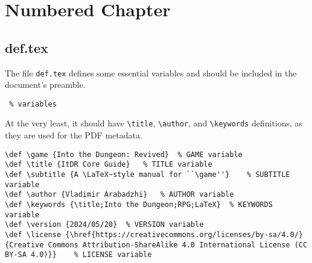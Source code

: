 \documentclass[itdr]{subfiles}
\begin{document}
\chapter{Numbered Chapter}
\label{ch:numbered}

\section{def.tex}

The file \lstinline!def.tex! defines some essential variables and should be included in the document's preamble.

\begin{lstlisting}
 % variables
\end{lstlisting}

At the very least, it should have \lstinline!\title!, \lstinline!\author!, and \lstinline!\keywords! definitions, as they are used for the PDF metadata.

\vspace{\baselineskip}
\noindent\begin{minipage}{\textwidth}
\begin{lstlisting}
\def \game {Into the Dungeon: Revived}	% GAME variable
\def \title {ItDR Core Guide}	% TITLE variable
\def \subtitle {A \LaTeX~style manual for ``\game''}	% SUBTITLE variable
\def \author {Vladimir Arabadzhi}	% AUTHOR variable
\def \keywords {\title;Into the Dungeon;RPG;LaTeX}	% KEYWORDS variable
\def \version {2024/05/20}	% VERSION variable
\def \license {\href{https://creativecommons.org/licenses/by-sa/4.0/}{Creative Commons Attribution-ShareAlike 4.0 International License (CC BY-SA 4.0)}}	% LICENSE variable
\end{lstlisting}
\end{minipage}

\vfill
\end{document}

